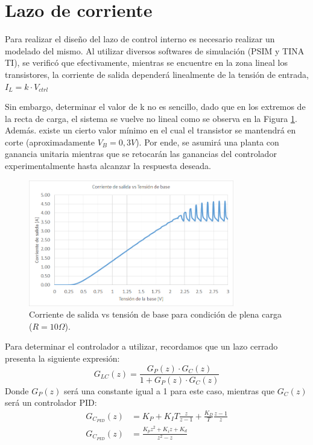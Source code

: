 \section{Lazo de corriente}
Para realizar el diseño del lazo de control interno es necesario realizar un modelado del mismo. Al utilizar diversos softwares de simulación (PSIM y TINA TI), se verificó que efectivamente, mientras se encuentre en la zona lineal los transistores, la corriente de salida dependerá linealmente de la tensión de entrada, $I_L=k\cdot V_{ctrl}$\par 
Sin embargo, determinar el valor de k no es sencillo, dado que en los extremos de la recta de carga, el sistema se vuelve no lineal como se observa en la Figura \ref{F:Recta_de_carga_corriente}. Además. existe un cierto valor mínimo en el cual el transistor se mantendrá en corte (aproximadamente $V_B=0,3V$). Por ende, se asumirá una planta con ganancia unitaria mientras que se retocarán las ganancias del controlador experimentalmente hasta alcanzar la respuesta deseada.\par 
\begin{figure} [H]
	\centering
	\includegraphics[width=0.8\textwidth]{./imagenes/Recta_de_carga_corriente.png}
	\caption{Corriente de salida vs tensión de base para condición de plena carga ($R=10\Omega$).}
	\label{F:Recta_de_carga_corriente}
\end{figure} \par 

Para determinar el controlador a utilizar, recordamos que un lazo cerrado presenta la siguiente expresión:
\begin{equation}
G_{LC}(z)=\frac{G_P(z)\cdot G_C(z)}{1+G_P(z)\cdot G_C(z)}
\end{equation}
Donde $G_P(z)$ será una constante igual a 1 para este caso, mientras que  $G_C(z)$ será un controlador PID:
\begin{equation} 
\begin{split}
G_{C_{PID}}(z)&=K_P+K_IT\frac{z}{z-1}+\frac{K_D}{T}\frac{z-1}{z} \\
G_{C_{PID}}(z)&=\frac{K_pz^2+K_iz+K_d}{z^2-z}
\end{split}
\end{equation}\par 

